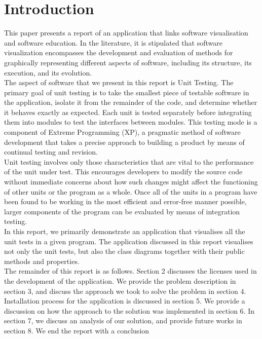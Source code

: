 \documentclass[a4paper,12pt]{article}
\begin{document}
\section{Introduction}
This paper presents a report of an application that links software visualisation and software education. In the literature, it is stipulated that software visualization encompasses the development and evaluation of methods for graphically representing different aspects of software, including its structure, its execution, and its evolution.\\
\linebreak  
The aspect of software that we present in this report is Unit Testing\cite{unitTests}. The primary goal of unit testing is to take the smallest piece of testable software in the application, isolate it from the remainder of the code, and determine whether it behaves exactly as expected. Each unit is tested separately before integrating them into modules to test the interfaces between modules.
This testing mode is a component of Extreme Programming (XP)\cite{xp}, a pragmatic method of software development that takes a precise approach to building a product by means of continual testing and revision.\\
\linebreak  
Unit testing involves only those characteristics that are vital to the performance of the unit under test. This encourages developers to modify the source code without immediate concerns about how such changes might affect the functioning of other units or the program as a whole. Once all of the units in a program have been found to be working in the most efficient and error-free manner possible, larger components of the program can be evaluated by means of integration testing.\\
\linebreak  
In this report, we primarily demonstrate an application that visualises all the unit tests in a given program. The application discussed in this report visualises not only the unit tests, but also the class diagrams together with their public methods and properties.\\
\linebreak  
The remainder of this report is as follows. Section 2 discusses the licenses used in the development of the application. We provide the problem description in section 3, and discuss the approach we took to solve the problem in section 4. Installation process for the application is discussed in section 5. We provide a discussion on how the approach to the solution was implemented in section 6. In section 7, we discuss an analysis of our solution, and provide future works in section 8. We end the report with a conclusion
\end{document}
